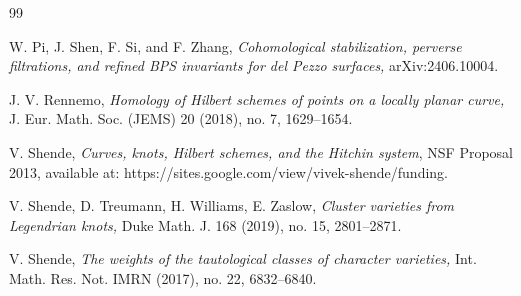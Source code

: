\documentclass{pspum-l}
\theoremstyle{plain}
\theoremstyle{definition}
\theoremstyle{remark}
\newcommand{\CM}{{\mathcal M}}
\begin{document}
\begin{thebibliography}{99}








 W. Pi, J. Shen, F. Si, and F. Zhang, {\em Cohomological stabilization, perverse filtrations, and refined BPS invariants for del Pezzo surfaces,} arXiv:2406.10004.



 J. V. Rennemo, {\em Homology of Hilbert schemes of points on a locally planar curve,} J. Eur. Math. Soc. (JEMS) 20 (2018), no. 7, 1629--1654.








 V. Shende, {\em Curves, knots, Hilbert schemes, and the Hitchin system}, NSF Proposal 2013, available at: https://sites.google.com/view/vivek-shende/funding.

 V. Shende, D. Treumann, H. Williams, E. Zaslow, {\em Cluster varieties from Legendrian knots,} Duke Math. J. 168 (2019), no. 15, 2801--2871.



 V. Shende, {\em The weights of the tautological classes of character varieties,} Int. Math. Res. Not. IMRN (2017), no. 22, 6832--6840.




\end{thebibliography}
\end{document}
